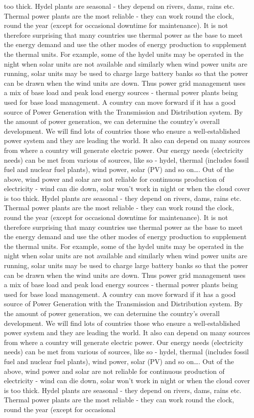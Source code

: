 \documentclass[10pt, a4paper]{article}
\begin{document}
too thick. Hydel plants are seasonal - they depend on rivers, dams, rains etc. Thermal power plants are the most reliable - they can work round the clock, round the year (except for occasional downtime for maintenance). It is not therefore surprising that many countries use thermal power as the base to meet the energy demand and use the other modes of energy production to supplement the thermal units. For example, some of the hydel units may be operated in the night when solar units are not available and similarly when wind power units are running, solar units may be used to charge large battery banks so that the power can be drawn when the wind units are down. Thus power grid management uses a mix of base load and peak load energy sources - thermal power plants being used for base load management. A country can move forward if it has a good source of Power Generation with the Transmission and Distribution system. By the amount of power generation, we can determine the country’s overall development. We will find lots of countries those who ensure a well-established power system and they are leading the world. It also can depend on many sources from where a country will generate electric power. Our energy needs (electricity needs) can be met from various of sources, like so - hydel, thermal (includes fossil fuel and nuclear fuel plants), wind power, solar (PV) and so on\dots. Out of the above, wind power and solar are not reliable for continuous production of electricity - wind can die down, solar won’t work in night or when the cloud cover is too thick. Hydel plants are seasonal - they depend on rivers, dams, rains etc. Thermal power plants are the most reliable - they can work round the clock, round the year (except for occasional downtime for maintenance). It is not therefore surprising that many countries use thermal power as the base to meet the energy demand and use the other modes of energy production to supplement the thermal units. For example, some of the hydel units may be operated in the night when solar units are not available and similarly when wind power units are running, solar units may be used to charge large battery banks so that the power can be drawn when the wind units are down. Thus power grid management uses a mix of base load and peak load energy sources - thermal power plants being used for base load management. A country can move forward if it has a good source of Power Generation with the Transmission and Distribution system. By the amount of power generation, we can determine the country’s overall development. We will find lots of countries those who ensure a well-established power system and they are leading the world. It also can depend on many sources from where a country will generate electric power. Our energy needs (electricity needs) can be met from various of sources, like so - hydel, thermal (includes fossil fuel and nuclear fuel plants), wind power, solar (PV) and so on\dots. Out of the above, wind power and solar are not reliable for continuous production of electricity - wind can die down, solar won’t work in night or when the cloud cover is too thick. Hydel plants are seasonal - they depend on rivers, dams, rains etc. Thermal power plants are the most reliable - they can work round the clock, round the year (except for occasional 
\end{document}
